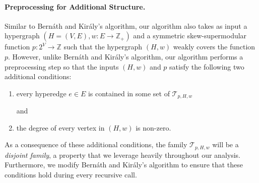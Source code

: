 \documentclass{article}
\newcommand{\maximalTightSetFamily}[1]{\ensuremath{\calT_{#1}}\xspace}
\newcommand{\shubhang}[1]{{\color{blue}[{\tiny Shubhang: \bf #1}]\marginpar{\color{blue}*}}}
\providecommand{\Z}{\mathbb{Z}}
\providecommand{\calT}{\mathcal{T}}
\begin{document}
\paragraph{Preprocessing for Additional Structure.}
Similar to Bern\'{a}th and Kir\'{a}ly's algorithm, our algorithm also takes as input a hypergraph $(H=(V, E), w: E\rightarrow \Z_+)$ and a symmetric skew-supermodular function $p: 2^V\rightarrow \Z$ such that the hypergraph $(H,w)$ weakly covers the function $p$. 
However, unlike Bern\'{a}th and Kir\'{a}ly's algorithm, our algorithm performs a preprocessing step so that the inputs $(H,w)$ and $p$ satisfy the following two additional conditions: 
\begin{enumerate}[label=(\alph*)]
    \item \hypertarget{WeakToStrong(a)}{every hyperedge $e\in E$ is contained in some set of $\mathcal{T}_{p, H, w}$} and 
    \item \hypertarget{WeakToStrong(b)}{the degree of every vertex in $(H, w)$ is non-zero.}
\end{enumerate}
As a consequence of these additional conditions, the family $\maximalTightSetFamily{p, H, w}$ will be a \emph{disjoint family},  
a property that we leverage heavily throughout our analysis.
Furthermore, we modify Bern\'{a}th and Kir\'{a}ly's algorithm to ensure that these conditions hold during every recursive call.
\end{document}
